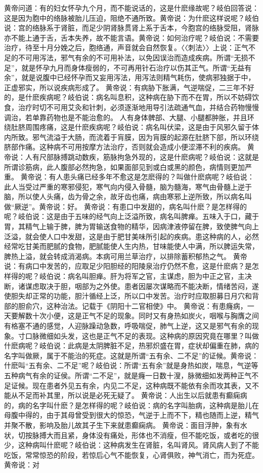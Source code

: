 \documentclass[12pt,UTF8]{ctexbook}
\begin{document}
黄帝问道：有的妇女怀孕九个月，而不能说话的，这是什麽缘故呢？岐伯回答说：这是因为胞中的络脉被胎儿压迫，阻绝不通所致。黄帝说：为什麽这样说呢？岐伯说：宫的络脉系于肾脏，而足少阴肾脉贯肾上系于舌本，今胞宫的络脉受阻，肾脉亦不能上通于舌，舌本失养，故不能言语。黄帝说：如何治疗呢？岐伯说：不需要治疗，待至十月分娩之后，胞络通，声音就会自然恢复。〈〈刺法〉〉上说：正气不足的不可用泻法，邪气有余的不可用补法，以免因误治而造成疾病。所谓“无损不足”，就是怀孕九月而身体瘦弱的，不可再用针石治疗以伤其正气。所谓“无益有余”，就是说腹中已经怀孕而又妄用泻法，用泻法则精气耗伤，使病邪独据于中，正虚邪实，所以说疾病形成了。
黄帝说：有病胁下胀满，气逆喘促，二三年不好的，是什麽疾病呢？岐伯说：病名叫息积，这种病在胁下而不在胃，所以不妨碍饮食，治疗时切不可用艾灸和针刺，必须逐渐地用导引法疏通气血，并结合药物慢慢调治，若单靠药物也是不能治愈的。
人有身体髀部、大腿、小腿都肿胀，并且环绕肚脐周围疼痛，这是什麽疾病呢？岐伯说：病名叫伏梁，这是由于风邪久留于体内所致。邪气流溢于大肠，而流着于肓膜，因为肓膜的起源在肚脐下部，所以环绕脐部作痛。这种病不可用按摩方法治疗，否则就会造成小便涩滞不利的疾病。
黄帝说：人有尺部脉搏跳动数疾，筋脉拘急外现的，这是什麽病呢？岐伯说：这就是所谓诊筋病，此人腹部必然拘急，如果面部见到或白或黑的颜色，病情则更加严重。
黄帝说：有人患头痛已经多年不愈这是怎麽得的？叫做什麽病呢？岐伯说：此人当受过严重的寒邪侵犯，寒气向内侵入骨髓，脑为髓海，寒气由骨髓上逆于脑，所以使人头痛，齿为骨之余，故牙齿也痛，病由寒邪上逆所致，所以病名叫做“厥逆”。黄帝说：好。
黄帝说：有患口中发甜的，病名叫什麽？是怎样得的呢？岐伯说：这是由于五味的经气向上泛溢所致，病名叫脾瘅。五味入于口，藏于胃，其精气上输于脾，脾为胃输送食物的精华，因病津液停留在脾，致使脾气向上泛溢，就会使人口中发甜，这是由于肥甘美味所引起的疾病。患这种病的人，必然经常吃甘美而肥腻的食物，肥腻能使人生内热，甘味能使人中满，所以脾运失常，脾热上溢，就会转成消渴病。本病可用兰草治疗，以排除蓄积郁热之气。
黄帝说：有病口中发苦的，应取足少阳胆经的阳陵泉治疗仍然不愈，这是什麽病？是怎样得的呢？岐伯说：病名叫胆瘅。肝为将军之官，主谋虑，胆为中正之官，主决断，诸谋虑取决于胆，咽部为之外使。患者因屡次谋略而不能决断，情绪苦闷，遂使胆失却正常的功能，胆汁循经上泛，所以口中发苦。治疗时应取胆募日月穴和背部的胆俞穴，这种治法。记载于《阴阳十二官相使》中。
黄帝说：有患癃病，一天要解数十次小便，这是正气不足的现象。同时又有身热如炭火，咽喉与胸膺之间有格塞不通的感觉，人迎脉躁动急数，呼吸喘促，肺气上逆，这又是邪气有余的现象。寸口脉微细如头发，这也是正气不足的表现。这种病的原因究竟在哪里？叫做什麽病呢？岐伯说：此病是太阴脾脏不足，热邪炽盛在胃，症状却偏重在肺，病的名字叫做厥，属于不能治的死症。这就是所谓“五有余、二不足”的证候。黄帝说：什麽叫“五有余、二不足”呢？岐伯说：所谓“五有余”就是身热如炭，喘息，气逆等五种病气有余的证侯。所谓“二不足”，就是癃一日数十溲，脉微细如发两种正气不足证候。现在患者外见五有余，内见二不足，这种病既不能依有余而攻其表，又不能从不足而补其里，所以说是必死无疑了。
黄帝说：人出生以后就患有癫痫病的，病的名字叫什麽？是怎样得的呢？岐伯说：病的名字叫胎病，这种病是胎儿在母腹中得的，由于其母曾受到很大的惊恐，气逆于上而不下，精也随而上逆，精气并聚不散，影响及胎儿故其子生下来就患癫痫病。
黄帝说：面目浮肿，象有水状，切按脉搏大而且紧，身体没有痛处，形体也不消瘦，但不能吃饭，或者吃的很少，这种病叫什麽呢？岐伯说：这种病发生在肾脏，名叫肾风。肾风病人到了不能吃饭，常常惊恐的阶段，若惊后心气不能恢复，心肾俱败，神气消亡，而为死症。黄帝说：对
\end{document}
